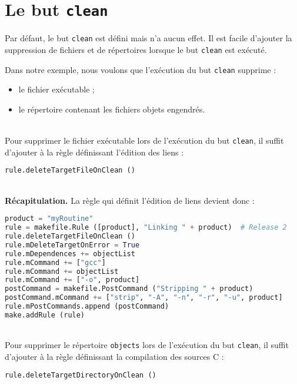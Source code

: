 \documentclass[a4paper,11pt]{extarticle}
\begin{document}
\section{Le but \texttt{clean}}

Par défaut, le but \texttt{clean} est défini mais n'a aucun effet. Il est facile d'ajouter la suppression de fichiers et de répertoires lorsque le but \texttt{clean} est exécuté.

Dans notre exemple, nous voulons que l'exécution du but \texttt{clean} supprime :
\begin{itemize}
  \item le fichier exécutable ;
  \item le répertoire contenant les fichiers objets engendrés.
\end{itemize}

~\\Pour supprimer le fichier exécutable lors de l'exécution du but \texttt{clean}, il suffit d'ajouter à la règle définissant l'édition des liens :

\begin{lstlisting}[language=py]
rule.deleteTargetFileOnClean ()
\end{lstlisting}


~\\{\bf Récapitulation.} La règle qui définit l'édition de liens devient donc :
\begin{lstlisting}[language=py]
product = "myRoutine"
rule = makefile.Rule ([product], "Linking " + product)  # Release 2
rule.deleteTargetFileOnClean ()
rule.mDeleteTargetOnError = True
rule.mDependences += objectList
rule.mCommand += ["gcc"]
rule.mCommand += objectList
rule.mCommand += ["-o", product]
postCommand = makefile.PostCommand ("Stripping " + product)
postCommand.mCommand += ["strip", "-A", "-n", "-r", "-u", product]
rule.mPostCommands.append (postCommand)
make.addRule (rule)
\end{lstlisting}


~\\Pour supprimer le répertoire \texttt{objects} lors de l'exécution du but \texttt{clean}, il suffit d'ajouter à la règle définissant la compilation des sources C :

\begin{lstlisting}[language=py]
  rule.deleteTargetDirectoryOnClean ()
\end{lstlisting}
\end{document}
